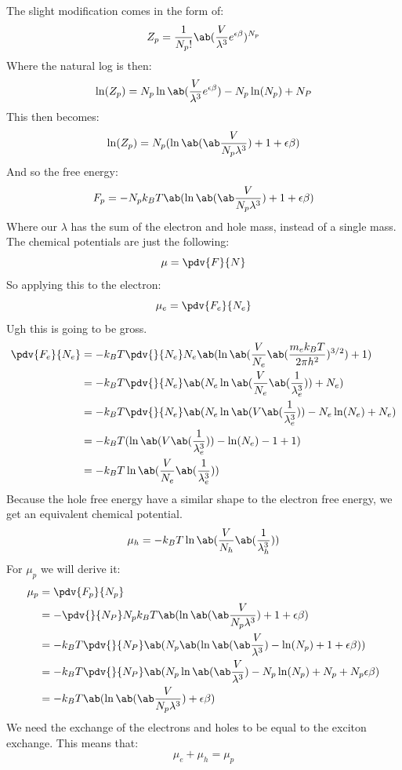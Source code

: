 The slight modification comes in the form of:
\begin{equation}
    Z_p = \frac{1}{N_p!}\ab(\frac{V}{\lambda^3}e^{\epsilon \beta})^{N_p}
\end{equation}
Where the natural log is then:
\begin{equation}
    \ln(Z_p) = N_p\ln\ab(\frac{V}{\lambda^3}e^{\epsilon \beta}) - N_p\ln(N_p) + N_P
\end{equation}
This then becomes:
\begin{equation}
    \ln(Z_p) = N_p(\ln\ab(\ab\frac{V}{N_p\lambda^3})+ 1 + \epsilon\beta)
\end{equation}
And so the free energy:
\begin{equation}
    F_p = -N_pk_B T\ab(\ln\ab(\ab\frac{V}{N_p\lambda^3})+ 1 + \epsilon\beta)
\end{equation}
Where our $\lambda$ has the sum of the electron and hole mass, instead of a single mass.
The chemical potentials are just the following:
\begin{equation}
    \mu = \pdv{F}{N}
\end{equation}
So applying this to the electron:
\begin{equation}
    \mu_e = \pdv{F_e}{N_e}
\end{equation}
Ugh this is going to be gross.
\begin{align}
    \pdv{F_e}{N_e} &= -k_B T \pdv{}{N_e}N_e\ab(\ln\ab(\frac{V}{N_e}\ab(\frac{m_e k_B T}{2\pi h^2})^{3/2})+1)\\
    &= -k_B T \pdv{}{N_e}\ab(N_e\ln\ab(\frac{V}{N_e}\ab(\frac{1}{\lambda_e^3}))+N_e)\\
    &= -k_B T \pdv{}{N_e}\ab(N_e\ln\ab(V\ab(\frac{1}{\lambda_e^3})) - N_e\ln(N_e) + N_e)\\
    &= -k_B T(\ln\ab(V\ab(\frac{1}{\lambda_e^3})) -\ln(N_e) - 1 + 1)\\
    &= -k_B T\ln\ab(\frac{V}{N_e}\ab(\frac{1}{\lambda_e^3}))
\end{align}
Because the hole free energy have a similar shape to the electron free energy, we get an equivalent chemical potential.
\begin{equation}
    \mu_h = -k_B T\ln\ab(\frac{V}{N_h}\ab(\frac{1}{\lambda_h^3}))
\end{equation}
For $\mu_p$ we will derive it:
\begin{align}
    \mu_p &= \pdv{F_p}{N_p}\\
    &= -\pdv{}{N_P}N_pk_B T\ab(\ln\ab(\ab\frac{V}{N_p\lambda^3})+ 1 + \epsilon\beta)\\
    &= -k_B T \pdv{}{N_P} \ab(N_p\ab(\ln\ab(\ab\frac{V}{\lambda^3}) - \ln(N_p)+ 1 + \epsilon\beta))\\
    &= -k_B T \pdv{}{N_P}\ab(N_p\ln\ab(\ab\frac{V}{\lambda^3}) - N_p\ln(N_p)+ N_p + N_p\epsilon\beta)\\
    &= -k_B T \ab(\ln\ab(\ab\frac{V}{N_p\lambda^3})+\epsilon\beta)
\end{align}
We need the exchange of the electrons and holes to be equal to the exciton exchange. This means that:
\begin{equation}
    \mu_e + \mu_h = \mu_p
\end{equation}